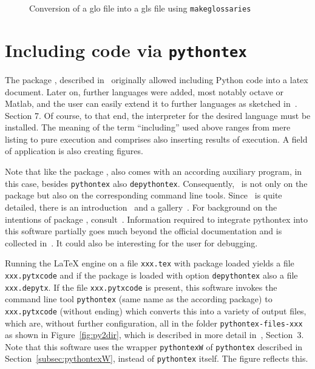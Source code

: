 \begin{figure}[htb]
\centering
{}
\caption{\label{fig:glo2gls}Conversion of a glo file into a gls file 
using \texttt{makeglossaries}}
\end{figure}


\section{Including code via \texttt{pythontex}}\label{sec:pythontex}

The package , described in~\cite{PythonTexP} 
originally allowed including Python code into a latex document. 
Later on, further languages were added, most notably octave or Matlab, 
and the user can easily extend it to further languages 
as sketched in~\cite{PythonTexP}. Section 7. 
Of course, to that end, the interpreter for the desired language must be installed.
The meaning of the term ``including'' used above 
ranges from mere listing to pure execution and comprises also inserting results of execution. 
A field of application is also creating figures. 

Note that like the package , also  
comes with an according auxiliary program, 
in this case, besides \texttt{pythontex} also \texttt{depythontex}. 
Consequently,~\cite{PythonTexP} is not only on the package 
but also on the corresponding command line tools. 
Since~\cite{PythonTexP} is quite detailed, 
there is an introduction~\cite{PythonTexQ} and a gallery~\cite{PythonTexG}. 
For background on the intentions of package , consult~\cite{PythonTexRepr}. 
Information required to integrate pythontex into this software 
partially goes much beyond the official documentation and is collected in~\cite{PyTexInOut}. 
It could also be interesting for the user for debugging. 

Running the \LaTeX{} engine on a file \texttt{xxx.tex} 
with package  loaded 
yields a file \texttt{xxx.pytxcode} 
and if the package is loaded with option \texttt{depythontex} 
also a file \texttt{xxx.depytx}.
If the file \texttt{xxx.pytxcode} is present, 
this software invokes the command line tool \texttt{pythontex} 
(same name as the according package) 
to \texttt{xxx.pytxcode} (without ending) 
which converts this into a variety of output files, 
which are, without further configuration, 
all in the folder \texttt{pythontex-files-xxx}
as shown in Figure~\ref{fig:py2dir}, 
which is described in more detail in~\cite{PyTexInOut}, Section~3. 
Note that this software uses the wrapper \texttt{pythontexW} 
of \texttt{pythontex} described in Section~\ref{subsec:pythontexW}, 
instead of \texttt{pythontex} itself. 
The figure reflects this. 

